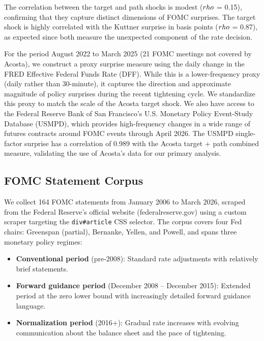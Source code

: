 \documentclass[12pt]{article}
\begin{document}
The correlation between the target and path shocks is modest ($\\rho$ = 0.15), confirming that they capture distinct dimensions of FOMC surprises. The target shock is highly correlated with the Kuttner surprise in basis points ($\\rho$ = 0.87), as expected since both measure the unexpected component of the rate decision.

For the period August 2022 to March 2025 (21 FOMC meetings not covered by Acosta), we construct a proxy surprise measure using the daily change in the FRED Effective Federal Funds Rate (DFF). While this is a lower-frequency proxy (daily rather than 30-minute), it captures the direction and approximate magnitude of policy surprises during the recent tightening cycle. We standardize this proxy to match the scale of the Acosta target shock. We also have access to the Federal Reserve Bank of San Francisco's U.S. Monetary Policy Event-Study Database (USMPD), which provides high-frequency changes in a wide range of futures contracts around FOMC events through April 2026. The USMPD single-factor surprise has a correlation of 0.989 with the Acosta target + path combined measure, validating the use of Acosta's data for our primary analysis.

\subsection{FOMC Statement Corpus}

We collect 164 FOMC statements from January 2006 to March 2026, scraped from the Federal Reserve's official website (federalreserve.gov) using a custom scraper targeting the \texttt{div\#article} CSS selector. The corpus covers four Fed chairs: Greenspan (partial), Bernanke, Yellen, and Powell, and spans three monetary policy regimes:

\begin{itemize}
\item \textbf{Conventional period} (pre-2008): Standard rate adjustments with relatively brief statements.
\item \textbf{Forward guidance period} (December 2008 -- December 2015): Extended period at the zero lower bound with increasingly detailed forward guidance language.
\item \textbf{Normalization period} (2016+): Gradual rate increases with evolving communication about the balance sheet and the pace of tightening.
\end{itemize}
\end{document}
